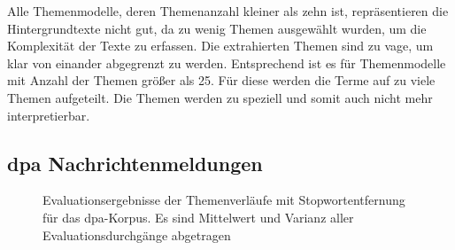 Alle Themenmodelle, deren Themenanzahl kleiner als zehn ist, repräsentieren die Hintergrundtexte nicht gut, da zu wenig Themen ausgewählt wurden, um die Komplexität der Texte zu erfassen. Die extrahierten Themen sind zu vage, um klar von einander abgegrenzt zu werden. Entsprechend ist es für Themenmodelle mit Anzahl der Themen größer als 25. Für diese werden die Terme auf zu viele Themen aufgeteilt. Die Themen werden zu speziell und somit auch nicht mehr interpretierbar. 

\subsection{dpa Nachrichtenmeldungen}
\begin{figure}
\caption{Evaluationsergebnisse der Themenverläufe mit Stopwortentfernung für das dpa-Korpus. Es sind Mittelwert und Varianz aller Evaluationsdurchgänge abgetragen}
\label{fig:dpaTopicModelEvaluationStop}
\end{figure}

